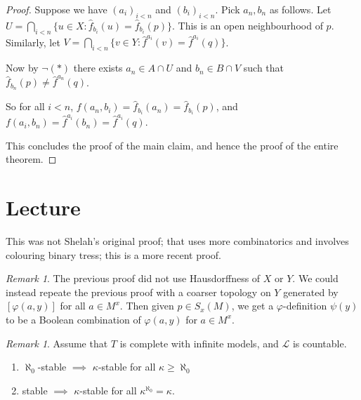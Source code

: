 \documentclass[]{article}
\theoremstyle{custhm}
\theoremstyle{cusdef}
\theoremstyle{custhm}
\theoremstyle{custhm}
\theoremstyle{custhm}
\theoremstyle{ex}
\theoremstyle{custhm}
\theoremstyle{cusdef}
\theoremstyle{remark}
\theoremstyle{remark}
\theoremstyle{numremark}
\newtheorem{numremark}[theorem]{Remark}
\renewcommand{\L}{\mathcal{L}}
\renewcommand{\phi}{\varphi}
\begin{document}
\begin{proof}
	Suppose we have $(a_i)_{i < n}$ and $(b_i)_{i<n}$. Pick $a_n,b_n$ as follows. Let $U = \bigcap_{i<n}\{u\in X:\hat{f}_{b_i}(u) = \hat{f}_{b_i}(p)\}$. This is an open neighbourhood of $p$. Similarly, let $V = \bigcap_{i<n}\{v\in Y:\hat{f}^{a_i}(v) = \hat{f}^{a_i}(q)\}$.

	Now by $\neg(\ast)$ there exists $a_n\in A\cap U$ and $b_n\in B\cap V$ such that $\hat{f}_{b_n}(p) \ne \hat{f}^{a_n}(q)$.

	So for all $i < n$, $f(a_n,b_i) = \hat{f}_{b_i}(a_n) = \hat{f}_{b_i}(p)$, and $f(a_i,b_n) = \hat{f}^{a_i}(b_n) = \hat{f}^{a_i}(q)$.

	This concludes the proof of the main claim, and hence the proof of the entire theorem.
\end{proof}

\section{Lecture}

This was not Shelah's original proof; that uses more combinatorics and involves colouring binary tress; this is a more recent proof.

\begin{numremark}
	The previous proof did not use Hausdorffness of $X$ or $Y$. We could instead repeate the previous proof with a coarser topology on $Y$ generated by $[\phi(a,y)]$ for all $a \in M^x$. Then given $p \in S_x(M)$, we get a $\phi$-definition $\psi(y)$ to be a Boolean combination of $\phi(a,y)$ for $a\in M^x$.
\end{numremark}

\begin{numremark}
	Assume that $T$ is complete with infinite models, and $\L$ is countable.
	\begin{enumerate}[label=\arabic*)]
		\item $\aleph_0$-stable $\implies$ $\kappa$-stable for all $\kappa \ge \aleph_0$
		\item stable $\implies$ $\kappa$-stable for all $\kappa^{\aleph_0} = \kappa$.
	\end{enumerate}
\end{numremark}
\end{document}
